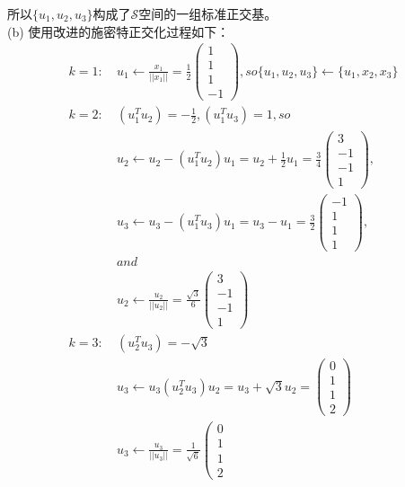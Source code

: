 \documentclass[UTF8,12pt, a4paper]{ctexart}
\begin{document}
所以$\{ u_1,u_2,u_3\}$构成了$\mathcal{S}$空间的一组标准正交基。\\
(b) 使用改进的施密特正交化过程如下：
\begin{align*}
  k=1:\  &u_1 \leftarrow \frac{x_1}{||x_1||} 
  = \frac{1}{2}
  \left(
    \begin{matrix}
      1 \\ 1\\ 1\\ -1
    \end{matrix}
  \right),so
  \{u_1,u_2,u_3\}\leftarrow\{u_1, x_2,x_3\} \\
  k=2:\  & (u_1^Tu_2) = -\frac{1}{2},(u_1^Tu_3) = 1,so\\
  & u_2\leftarrow u_2-(u_1^Tu_2)u_1
  =u_2 + \frac{1}{2} u_1 
  = \frac{3}{4} 
  \left(
    \begin{matrix}
      3 \\ -1 \\ -1 \\ 1
    \end{matrix}
  \right),\\
  &u_3\leftarrow u_3-(u_1^Tu_3)u_1
  =u_3-u_1 
  = \frac{3}{2} 
  \left(
    \begin{matrix}
      -1 \\ 1 \\ 1 \\ 1
    \end{matrix}
  \right),\\
  &and \\
  & u_2 \leftarrow \frac{u_2}{||u_2||}
  = \frac{\sqrt{3}}{6} \left(
    \begin{matrix}
      3 \\ -1 \\ -1 \\ 1
    \end{matrix}  
  \right)\\
  k=3:\  & (u_2^Tu_3)=-\sqrt{3}\\
  & u_3 \leftarrow u_3 (u_2^Tu_3)u_2 =u_3+\sqrt{3}u_2 
  =\left(
    \begin{matrix}
      0 \\ 1 \\ 1 \\ 2
    \end{matrix}  
  \right) \\
  & u_3 \leftarrow \frac{u_3}{||u_3||} 
  = \frac{1}{\sqrt{6}} \left(
    \begin{matrix}
      0 \\ 1 \\ 1 \\ 2

\end{matrix}
\end{align*}
\end{document}
